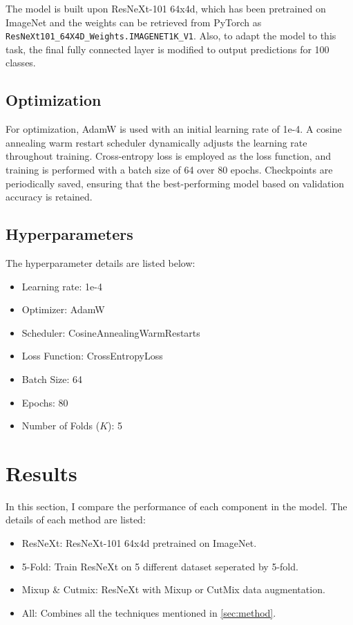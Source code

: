 \documentclass[10pt,twocolumn,letterpaper]{article}
\begin{document}
The model is built upon ResNeXt-101 64x4d, which has been pretrained on
ImageNet and the weights can be retrieved from PyTorch as
\verb'ResNeXt101_64X4D_Weights.IMAGENET1K_V1'. Also, to adapt the model to
this task, the final fully connected layer is modified to output predictions
for 100 classes.

\subsection{Optimization}

For optimization, AdamW is used with an initial learning rate of 1e-4. A
cosine annealing warm restart scheduler dynamically adjusts the learning
rate throughout training. Cross-entropy loss is employed as the loss
function, and training is performed with a batch size of 64 over 80 epochs.
Checkpoints are periodically saved, ensuring that the best-performing model
based on validation accuracy is retained.

\subsection{Hyperparameters}

\noindent The hyperparameter details are listed below:
\begin{itemize}
  \setlength\itemsep{0pt}
  \item Learning rate: 1e-4
  \item Optimizer: AdamW
  \item Scheduler: CosineAnnealingWarmRestarts
  \item Loss Function: CrossEntropyLoss
  \item Batch Size: 64
  \item Epochs: 80
  \item Number of Folds ($K$): 5
\end{itemize}

\section{Results}

In this section, I compare the performance of each component in the model.
The details of each method are listed:
\begin{itemize}
  \setlength\itemsep{0pt}
  \item ResNeXt: ResNeXt-101 64x4d pretrained on ImageNet.
  \item 5-Fold: Train ResNeXt on 5 different dataset seperated by 5-fold.
  \item Mixup \& Cutmix: ResNeXt with Mixup or CutMix data augmentation.
  \item All: Combines all the techniques mentioned in \cref{sec:method}.
\end{itemize}
\end{document}
